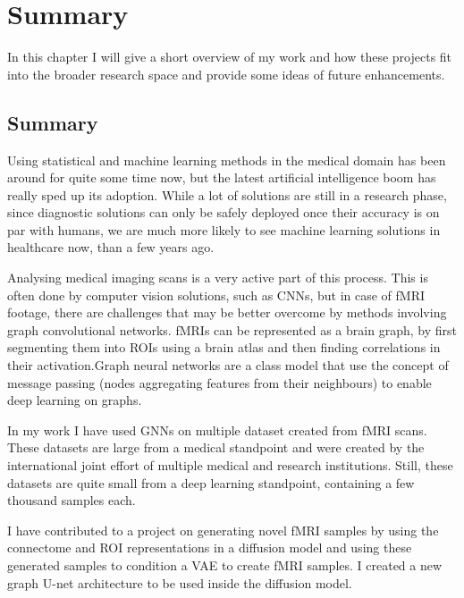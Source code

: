 \chapter{Summary}

In this chapter I will give a short overview of my work and how these projects fit into the broader research space and provide some ideas of future enhancements.

\section{Summary}

Using statistical and machine learning methods in the medical domain has been around for quite some time now, but the latest artificial intelligence boom has really sped up its adoption. While a lot of solutions are still in a research phase, since diagnostic solutions can only be safely deployed once their accuracy is on par with humans, we are much more likely to see machine learning solutions in healthcare now, than a few years ago.

Analysing medical imaging scans is a  very active part of this process. This is often done by computer vision solutions, such as CNNs, but in case of fMRI footage, there are challenges that may be better overcome by methods involving graph convolutional networks. fMRIs can be represented as a brain graph, by first segmenting them into ROIs using a brain atlas and then finding correlations in their activation.Graph neural networks are a class model that use the concept of message passing (nodes aggregating features from their neighbours) to enable deep learning on graphs. 


In my work I have used GNNs on multiple dataset created from fMRI scans. These datasets are large from a medical standpoint and were created by the international joint effort of multiple medical and research institutions. Still, these datasets are quite small from a deep learning standpoint, containing a few thousand samples each.

I have contributed to a project on generating novel fMRI samples by using the connectome and ROI representations in a diffusion model and using these generated samples to condition a VAE to create fMRI samples. I created a new graph U-net architecture to be used inside the diffusion model. 


